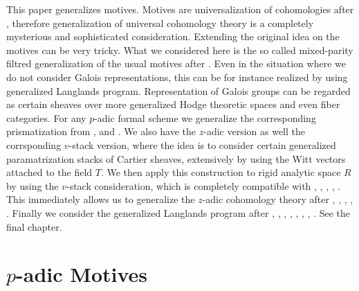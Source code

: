 \documentclass[12pt]{article}
\theoremstyle{definition}
\begin{document}
\indent This paper generalizes motives. Motives are universalization of cohomologies after \cite{G}, therefore generalization of universal cohomology theory is a completely mysterious and sophisticated consideration. Extending the original idea on the motives can be very tricky. What we considered here is the so called mixed-parity filtred generalization of the usual motives after \cite{BSB}. Even in the situation where we do not consider Galois representations, this can be for instance realized by using generalized Langlands program. Representation of Galois groups can be regarded as certain sheaves over more generalized Hodge theoretic spaces and even fiber categories. For any $p$-adic formal scheme we generalize the corresponding prismatization from \cite{BSI}, \cite{BLI} and \cite{DI}. We also have the $z$-adic version as well the corrsponding $v$-stack version, where the idea is to consider certain generalized paramatrization stacks of Cartier sheaves, extensively by using the Witt vectors attached to the field $T$. We then apply this construction to rigid analytic space $R$ by using the $v$-stack consideration, which is completely compatible with \cite{TI}, \cite{TII}, \cite{TIII}, \cite{SchI}, \cite{ALBRCS}. This immediately allows us to generalize the $z$-adic cohomology theory after \cite{KLI}, \cite{KLII}, \cite{SchII}, \cite{SchIII}, \cite{SchIV}. Finally we consider the generalized Langlands program after \cite{TIV}, \cite{TV}, \cite{TVI}, \cite{L}, \cite{FS}, \cite{VL}, \cite{DII}, \cite{DIII}. See the final chapter.

\section{$p$-adic Motives}
\end{document}
